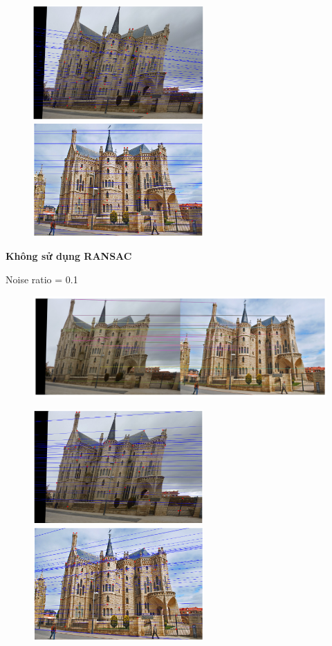 \documentclass[11pt]{article}
\begin{document}
\begin{figure}[H]
    \centering
    \includegraphics[width=6.5cm]{images/part3/ransac_image_3_noise_0.2_left.png}
    \includegraphics[width=6.5cm]{images/part3/ransac_image_3_noise_0.2_right.png}
\end{figure}

\textbf{Không sử dụng RANSAC}

Noise ratio = 0.1
\begin{figure}[H]
    \centering
    \includegraphics[width=14cm]{images/part3/no_ransac_image_1_noise_0.1_1.png}
\end{figure}

\begin{figure}[H]
    \centering
    \includegraphics[width=6.5cm]{images/part3/no_ransac_image_1_noise_0.1_left.png}
    \includegraphics[width=6.5cm]{images/part3/no_ransac_image_1_noise_0.1_right.png}
\end{figure}
\end{document}
